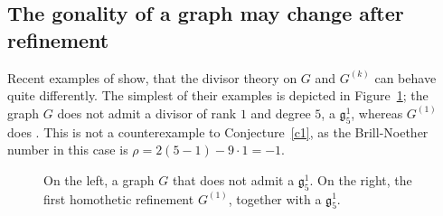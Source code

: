 \documentclass[11pt]{amsart}
\newtheorem{question}{Question}
\begin{document}

\subsection{The gonality of a graph may change after refinement}\label{subsec:example}

Recent examples of \cite{MR4397104} show, that the divisor theory on $G$ and $G^{(k)}$ can behave quite differently. The simplest of their examples is depicted in Figure~\ref{fig: tricycle}; the graph $G$ does not admit a divisor of rank $1$ and degree $5$, a $\mathfrak g_5^1$, whereas $G^{(1)}$ does \cite[Proposition 4.2 and Theorem 4.8]{MR4397104}. This is not a counterexample to Conjecture~\ref{c1}, as the Brill-Noether number in this case is $\rho = 2(5 - 1) - 9 \cdot 1 = -1.$
\begin{figure}[ht]
\caption{On the left, a graph $G$ that does not admit a $\mathfrak g_5^1$. On the right, the first homothetic refinement $G^{(1)}$, together with a $\mathfrak g_5^1$.  }
\label{fig: tricycle}
\end{figure}
\end{document}
